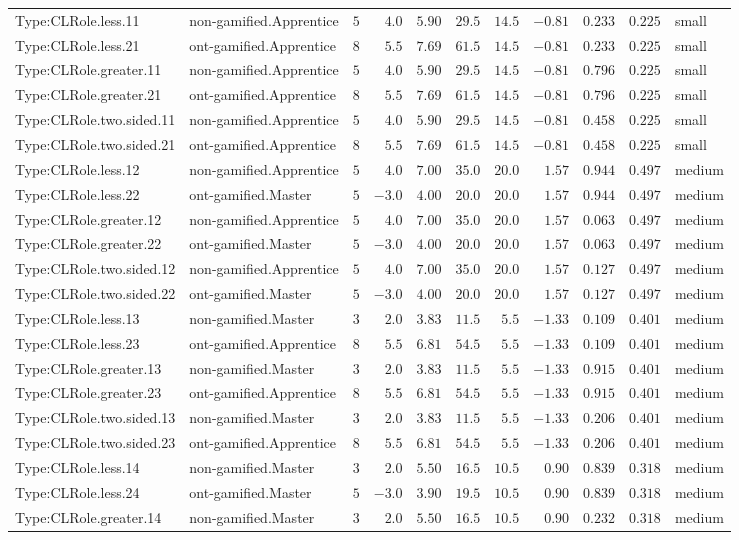 \documentclass[6pt,a4paper]{article}
\begin{document}
{\begin{longtable}{llrrrrrrrrl}
Type:CLRole.less.11&non-gamified.Apprentice&$ 5$&$ 4.0$&$ 5.90$&$ 29.5$&$14.5$&$-0.81$&$0.233$&$0.225$&small\tabularnewline
Type:CLRole.less.21&ont-gamified.Apprentice&$ 8$&$ 5.5$&$ 7.69$&$ 61.5$&$14.5$&$-0.81$&$0.233$&$0.225$&small\tabularnewline
Type:CLRole.greater.11&non-gamified.Apprentice&$ 5$&$ 4.0$&$ 5.90$&$ 29.5$&$14.5$&$-0.81$&$0.796$&$0.225$&small\tabularnewline
Type:CLRole.greater.21&ont-gamified.Apprentice&$ 8$&$ 5.5$&$ 7.69$&$ 61.5$&$14.5$&$-0.81$&$0.796$&$0.225$&small\tabularnewline
Type:CLRole.two.sided.11&non-gamified.Apprentice&$ 5$&$ 4.0$&$ 5.90$&$ 29.5$&$14.5$&$-0.81$&$0.458$&$0.225$&small\tabularnewline
Type:CLRole.two.sided.21&ont-gamified.Apprentice&$ 8$&$ 5.5$&$ 7.69$&$ 61.5$&$14.5$&$-0.81$&$0.458$&$0.225$&small\tabularnewline
Type:CLRole.less.12&non-gamified.Apprentice&$ 5$&$ 4.0$&$ 7.00$&$ 35.0$&$20.0$&$ 1.57$&$0.944$&$0.497$&medium\tabularnewline
Type:CLRole.less.22&ont-gamified.Master&$ 5$&$-3.0$&$ 4.00$&$ 20.0$&$20.0$&$ 1.57$&$0.944$&$0.497$&medium\tabularnewline
Type:CLRole.greater.12&non-gamified.Apprentice&$ 5$&$ 4.0$&$ 7.00$&$ 35.0$&$20.0$&$ 1.57$&$0.063$&$0.497$&medium\tabularnewline
Type:CLRole.greater.22&ont-gamified.Master&$ 5$&$-3.0$&$ 4.00$&$ 20.0$&$20.0$&$ 1.57$&$0.063$&$0.497$&medium\tabularnewline
Type:CLRole.two.sided.12&non-gamified.Apprentice&$ 5$&$ 4.0$&$ 7.00$&$ 35.0$&$20.0$&$ 1.57$&$0.127$&$0.497$&medium\tabularnewline
Type:CLRole.two.sided.22&ont-gamified.Master&$ 5$&$-3.0$&$ 4.00$&$ 20.0$&$20.0$&$ 1.57$&$0.127$&$0.497$&medium\tabularnewline
Type:CLRole.less.13&non-gamified.Master&$ 3$&$ 2.0$&$ 3.83$&$ 11.5$&$ 5.5$&$-1.33$&$0.109$&$0.401$&medium\tabularnewline
Type:CLRole.less.23&ont-gamified.Apprentice&$ 8$&$ 5.5$&$ 6.81$&$ 54.5$&$ 5.5$&$-1.33$&$0.109$&$0.401$&medium\tabularnewline
Type:CLRole.greater.13&non-gamified.Master&$ 3$&$ 2.0$&$ 3.83$&$ 11.5$&$ 5.5$&$-1.33$&$0.915$&$0.401$&medium\tabularnewline
Type:CLRole.greater.23&ont-gamified.Apprentice&$ 8$&$ 5.5$&$ 6.81$&$ 54.5$&$ 5.5$&$-1.33$&$0.915$&$0.401$&medium\tabularnewline
Type:CLRole.two.sided.13&non-gamified.Master&$ 3$&$ 2.0$&$ 3.83$&$ 11.5$&$ 5.5$&$-1.33$&$0.206$&$0.401$&medium\tabularnewline
Type:CLRole.two.sided.23&ont-gamified.Apprentice&$ 8$&$ 5.5$&$ 6.81$&$ 54.5$&$ 5.5$&$-1.33$&$0.206$&$0.401$&medium\tabularnewline
Type:CLRole.less.14&non-gamified.Master&$ 3$&$ 2.0$&$ 5.50$&$ 16.5$&$10.5$&$ 0.90$&$0.839$&$0.318$&medium\tabularnewline
Type:CLRole.less.24&ont-gamified.Master&$ 5$&$-3.0$&$ 3.90$&$ 19.5$&$10.5$&$ 0.90$&$0.839$&$0.318$&medium\tabularnewline
Type:CLRole.greater.14&non-gamified.Master&$ 3$&$ 2.0$&$ 5.50$&$ 16.5$&$10.5$&$ 0.90$&$0.232$&$0.318$&medium\tabularnewline

\end{longtable}}
\end{document}
